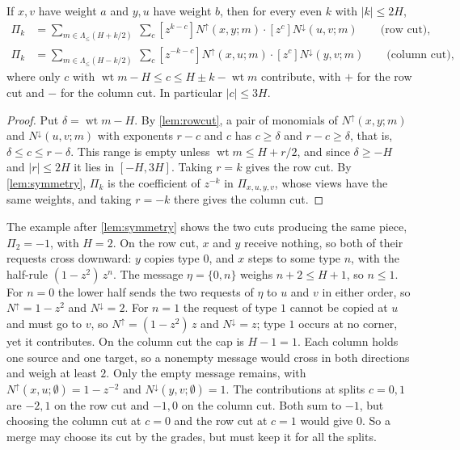 \documentclass[11pt]{article}
\theoremstyle{definition}
\theoremstyle{definition}
\theoremstyle{remark}
\newcommand{\wt}{\operatorname{wt}}
\newcommand{\Nup}{N^{\uparrow}}
\newcommand{\Ndown}{N^{\downarrow}}
\begin{document}
\begin{corollary}\label{cor:cuts}
If $x,v$ have weight $a$ and $y,u$ have weight $b$, then for every even $k$ with $|k|\le2H$,
\begin{align*}
\Pi_k&=\sum_{m\in\Lambda_{\le}(H+k/2)}\ \sum_c[z^{k-c}]\Nup(x,y;m)\cdot[z^c]\Ndown(u,v;m)\qquad\text{(row cut)},\\
\Pi_k&=\sum_{m\in\Lambda_{\le}(H-k/2)}\ \sum_c[z^{-k-c}]\Nup(x,u;m)\cdot[z^c]\Ndown(y,v;m)\qquad\text{(column cut)},
\end{align*}
where only $c$ with $\wt m-H\le c\le H\pm k-\wt m$ contribute, with $+$ for the row cut and $-$ for the column cut. In particular $|c|\le3H$.
\end{corollary}

\begin{proof}
Put $\delta=\wt m-H$. By \cref{lem:rowcut}, a pair of monomials of $\Nup(x,y;m)$ and $\Ndown(u,v;m)$ with exponents $r-c$ and $c$ has $c\ge\delta$ and $r-c\ge\delta$, that is, $\delta\le c\le r-\delta$. This range is empty unless $\wt m\le H+r/2$, and since $\delta\ge-H$ and $|r|\le2H$ it lies in $[-H,3H]$. Taking $r=k$ gives the row cut. By \cref{lem:symmetry}, $\Pi_k$ is the coefficient of $z^{-k}$ in $\Pi_{x,u,y,v}$, whose views have the same weights, and taking $r=-k$ there gives the column cut.
\end{proof}

The example after \cref{lem:symmetry} shows the two cuts producing the same piece, $\Pi_2=-1$, with $H=2$. On the row cut, $x$ and $y$ receive nothing, so both of their requests cross downward: $y$ copies type $0$, and $x$ steps to some type $n$, with the half-rule $(1-z^2)\,z^n$. The message $\eta=\{0,n\}$ weighs $n+2\le H+1$, so $n\le1$. For $n=0$ the lower half sends the two requests of $\eta$ to $u$ and $v$ in either order, so $\Nup=1-z^2$ and $\Ndown=2$. For $n=1$ the request of type $1$ cannot be copied at $u$ and must go to $v$, so $\Nup=(1-z^2)\,z$ and $\Ndown=z$; type $1$ occurs at no corner, yet it contributes. On the column cut the cap is $H-1=1$. Each column holds one source and one target, so a nonempty message would cross in both directions and weigh at least $2$. Only the empty message remains, with $\Nup(x,u;\emptyset)=1-z^{-2}$ and $\Ndown(y,v;\emptyset)=1$. The contributions at splits $c=0,1$ are $-2,1$ on the row cut and $-1,0$ on the column cut. Both sum to $-1$, but choosing the column cut at $c=0$ and the row cut at $c=1$ would give $0$. So a merge may choose its cut by the grades, but must keep it for all the splits.
\end{document}
